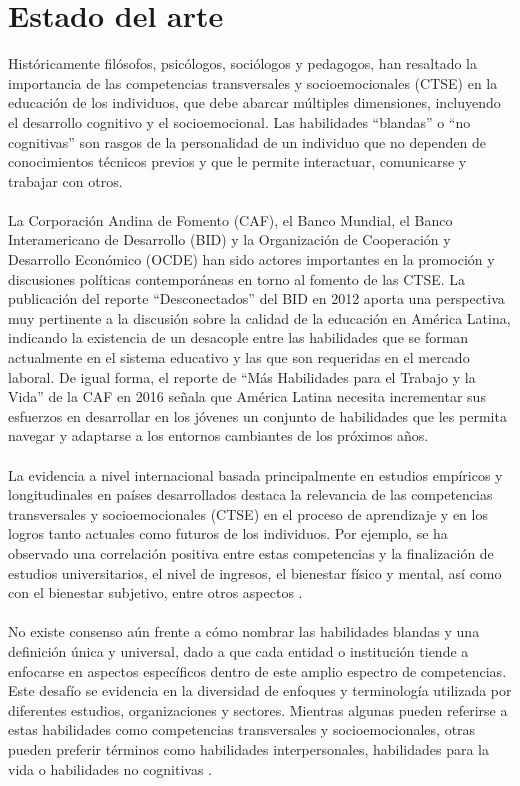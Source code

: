 \section{Estado del arte}

Históricamente filósofos, psicólogos, sociólogos y pedagogos, han resaltado la importancia de las competencias transversales y socioemocionales (CTSE) en la educación de los individuos, que debe abarcar múltiples dimensiones, incluyendo el desarrollo cognitivo y el socioemocional. Las habilidades “blandas” o “no cognitivas” son rasgos de la personalidad de un individuo que no dependen de conocimientos técnicos previos y que le permite interactuar, comunicarse y trabajar con otros.
\\
\\
La Corporación Andina de Fomento (CAF), el Banco Mundial, el Banco Interamericano de Desarrollo (BID) y la Organización de Cooperación y Desarrollo Económico (OCDE) han sido actores importantes en la promoción y discusiones políticas contemporáneas en torno al fomento de las CTSE. La publicación del reporte “Desconectados” del BID en 2012 aporta una perspectiva muy pertinente a la discusión sobre la calidad de la educación en América Latina, indicando la existencia de un desacople entre las habilidades que se forman actualmente en el sistema educativo y las que son requeridas en el mercado laboral. De igual forma, el reporte de “Más Habilidades para el Trabajo y la Vida” de la CAF en 2016 señala que América Latina necesita incrementar sus esfuerzos en desarrollar en los jóvenes un conjunto de habilidades que les permita navegar y adaptarse a los entornos cambiantes de los próximos años.
\\
\\
La evidencia a nivel internacional basada principalmente en estudios empíricos y longitudinales en países desarrollados destaca la relevancia de las competencias transversales y socioemocionales (CTSE) en el proceso de aprendizaje y en los logros tanto actuales como futuros de los individuos. Por ejemplo, se ha observado una correlación positiva entre estas competencias y la finalización de estudios universitarios, el nivel de ingresos, el bienestar físico y mental, así como con el bienestar subjetivo, entre otros aspectos \cite{Huerta2019}. 
\\
\\
No existe consenso aún frente a cómo nombrar las habilidades blandas y una definición única y universal, dado a que cada entidad o institución tiende a enfocarse en aspectos específicos dentro de este amplio espectro de competencias. Este desafío se evidencia en la diversidad de enfoques y terminología utilizada por diferentes estudios, organizaciones y sectores. Mientras algunas pueden referirse a estas habilidades como competencias transversales y socioemocionales, otras pueden preferir términos como habilidades interpersonales, habilidades para la vida o habilidades no cognitivas \cite{RomeroGonzalez2021}.
